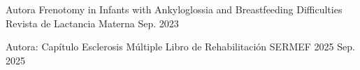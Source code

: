 

\begin{cventries}

  \cventry
    {Autora} %
    {Frenotomy in Infants with Ankyloglossia and Breastfeeding Difficulties} %
    {Revista de Lactancia Materna} %
    {Sep. 2023} %
    {}

  \cventry
    {Autora: Capítulo Esclerosis Múltiple} %
    {Libro de Rehabilitación SERMEF 2025} %
    {} %
    {Sep. 2025} %
    {}

\end{cventries}
